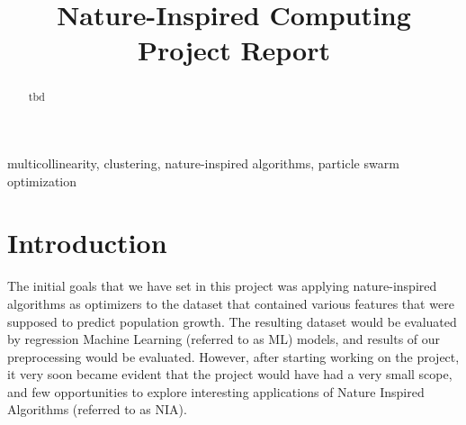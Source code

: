 \documentclass[conference]{IEEEtran}
\begin{document}
\title{Nature-Inspired Computing\\Project Report\\}

\author{
\and
{}
\and
{}
}

\maketitle

\begin{abstract}
tbd
\end{abstract}

\begin{IEEEkeywords}
multicollinearity, clustering, nature-inspired algorithms, particle swarm optimization
\end{IEEEkeywords}

\section{Introduction}

The initial goals that we have set in this project was applying nature-inspired algorithms as optimizers to the dataset that contained various features that were supposed to predict population growth. The resulting dataset would be evaluated by regression Machine Learning (referred to as ML) models, and results of our preprocessing would be evaluated. However, after starting working on the project, it very soon became evident that the project would have had a very small scope, and few opportunities to explore interesting applications of Nature Inspired Algorithms (referred to as NIA). \\ 
\end{document}
